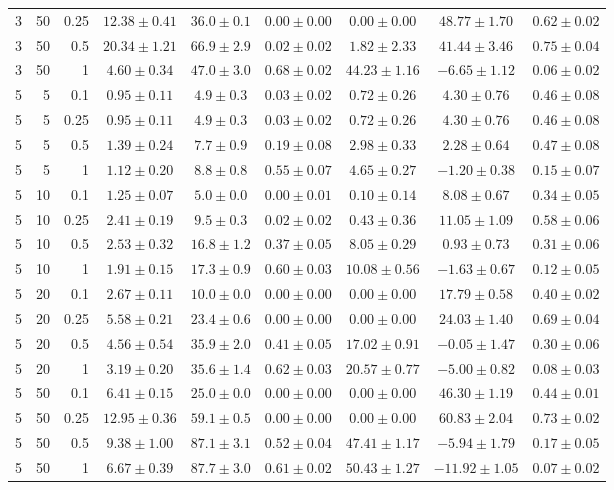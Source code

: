 \begin{table}[htbp]
\begin{tabular}{@{}rrrcccccc@{}}
3 & 50 & 0.25 & $12.38 \pm 0.41$ & $36.0 \pm 0.1$ & $0.00 \pm 0.00$ & $0.00 \pm 0.00$ & $48.77 \pm 1.70$ & $0.62 \pm 0.02$ \\
3 & 50 & 0.5 & $20.34 \pm 1.21$ & $66.9 \pm 2.9$ & $0.02 \pm 0.02$ & $1.82 \pm 2.33$ & $41.44 \pm 3.46$ & $0.75 \pm 0.04$ \\
3 & 50 & 1 & $4.60 \pm 0.34$ & $47.0 \pm 3.0$ & $0.68 \pm 0.02$ & $44.23 \pm 1.16$ & $-6.65 \pm 1.12$ & $0.06 \pm 0.02$ \\
\midrule
5 & 5 & 0.1 & $0.95 \pm 0.11$ & $4.9 \pm 0.3$ & $0.03 \pm 0.02$ & $0.72 \pm 0.26$ & $4.30 \pm 0.76$ & $0.46 \pm 0.08$ \\
5 & 5 & 0.25 & $0.95 \pm 0.11$ & $4.9 \pm 0.3$ & $0.03 \pm 0.02$ & $0.72 \pm 0.26$ & $4.30 \pm 0.76$ & $0.46 \pm 0.08$ \\
5 & 5 & 0.5 & $1.39 \pm 0.24$ & $7.7 \pm 0.9$ & $0.19 \pm 0.08$ & $2.98 \pm 0.33$ & $2.28 \pm 0.64$ & $0.47 \pm 0.08$ \\
5 & 5 & 1 & $1.12 \pm 0.20$ & $8.8 \pm 0.8$ & $0.55 \pm 0.07$ & $4.65 \pm 0.27$ & $-1.20 \pm 0.38$ & $0.15 \pm 0.07$ \\
5 & 10 & 0.1 & $1.25 \pm 0.07$ & $5.0 \pm 0.0$ & $0.00 \pm 0.01$ & $0.10 \pm 0.14$ & $8.08 \pm 0.67$ & $0.34 \pm 0.05$ \\
5 & 10 & 0.25 & $2.41 \pm 0.19$ & $9.5 \pm 0.3$ & $0.02 \pm 0.02$ & $0.43 \pm 0.36$ & $11.05 \pm 1.09$ & $0.58 \pm 0.06$ \\
5 & 10 & 0.5 & $2.53 \pm 0.32$ & $16.8 \pm 1.2$ & $0.37 \pm 0.05$ & $8.05 \pm 0.29$ & $0.93 \pm 0.73$ & $0.31 \pm 0.06$ \\
5 & 10 & 1 & $1.91 \pm 0.15$ & $17.3 \pm 0.9$ & $0.60 \pm 0.03$ & $10.08 \pm 0.56$ & $-1.63 \pm 0.67$ & $0.12 \pm 0.05$ \\
5 & 20 & 0.1 & $2.67 \pm 0.11$ & $10.0 \pm 0.0$ & $0.00 \pm 0.00$ & $0.00 \pm 0.00$ & $17.79 \pm 0.58$ & $0.40 \pm 0.02$ \\
5 & 20 & 0.25 & $5.58 \pm 0.21$ & $23.4 \pm 0.6$ & $0.00 \pm 0.00$ & $0.00 \pm 0.00$ & $24.03 \pm 1.40$ & $0.69 \pm 0.04$ \\
5 & 20 & 0.5 & $4.56 \pm 0.54$ & $35.9 \pm 2.0$ & $0.41 \pm 0.05$ & $17.02 \pm 0.91$ & $-0.05 \pm 1.47$ & $0.30 \pm 0.06$ \\
5 & 20 & 1 & $3.19 \pm 0.20$ & $35.6 \pm 1.4$ & $0.62 \pm 0.03$ & $20.57 \pm 0.77$ & $-5.00 \pm 0.82$ & $0.08 \pm 0.03$ \\
5 & 50 & 0.1 & $6.41 \pm 0.15$ & $25.0 \pm 0.0$ & $0.00 \pm 0.00$ & $0.00 \pm 0.00$ & $46.30 \pm 1.19$ & $0.44 \pm 0.01$ \\
5 & 50 & 0.25 & $12.95 \pm 0.36$ & $59.1 \pm 0.5$ & $0.00 \pm 0.00$ & $0.00 \pm 0.00$ & $60.83 \pm 2.04$ & $0.73 \pm 0.02$ \\
5 & 50 & 0.5 & $9.38 \pm 1.00$ & $87.1 \pm 3.1$ & $0.52 \pm 0.04$ & $47.41 \pm 1.17$ & $-5.94 \pm 1.79$ & $0.17 \pm 0.05$ \\
5 & 50 & 1 & $6.67 \pm 0.39$ & $87.7 \pm 3.0$ & $0.61 \pm 0.02$ & $50.43 \pm 1.27$ & $-11.92 \pm 1.05$ & $0.07 \pm 0.02$ \\
\bottomrule
\end{tabular}
\end{table}
